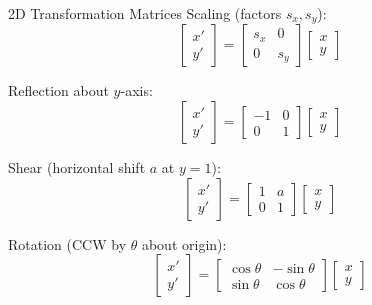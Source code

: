 \documentclass[11pt]{article}
\begin{document}
\begin{formulabox}{2D Transformation Matrices}
Scaling (factors $s_x, s_y$):
$$\begin{bmatrix} x' \\ y' \end{bmatrix} = \begin{bmatrix} s_x & 0 \\ 0 & s_y \end{bmatrix} \begin{bmatrix} x \\ y \end{bmatrix}$$

Reflection about $y$-axis:
$$\begin{bmatrix} x' \\ y' \end{bmatrix} = \begin{bmatrix} -1 & 0 \\ 0 & 1 \end{bmatrix} \begin{bmatrix} x \\ y \end{bmatrix}$$

Shear (horizontal shift $a$ at $y=1$):
$$\begin{bmatrix} x' \\ y' \end{bmatrix} = \begin{bmatrix} 1 & a \\ 0 & 1 \end{bmatrix} \begin{bmatrix} x \\ y \end{bmatrix}$$

Rotation (CCW by $\theta$ about origin):
$$\begin{bmatrix} x' \\ y' \end{bmatrix} = \begin{bmatrix} \cos\theta & -\sin\theta \\ \sin\theta & \cos\theta \end{bmatrix} \begin{bmatrix} x \\ y \end{bmatrix}$$
\end{formulabox}
\end{document}
